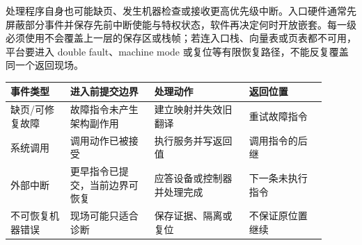 
处理程序自身也可能缺页、发生机器检查或接收更高优先级中断。入口硬件通常先屏蔽部分事件并保存先前中断使能与特权状态，软件再决定何时开放嵌套。每一级必须使用不会覆盖上一层的保存区或栈帧；若连入口栈、向量表或页表都不可用，平台要进入 double fault、machine mode 或复位等有限恢复路径，不能反复覆盖同一个返回现场。

\begin{longtable}{L{0.17\linewidth}L{0.24\linewidth}L{0.27\linewidth}L{0.22\linewidth}}
\toprule
事件类型 & 进入前提交边界 & 处理动作 & 返回位置 \\
\midrule
缺页/可修复故障 & 故障指令未产生架构副作用 & 建立映射并失效旧翻译 & 重试故障指令 \\\tablerowrule
系统调用 & 调用动作已被接受 & 执行服务并写返回值 & 调用指令的后继 \\\tablerowrule
外部中断 & 更早指令已提交，当前边界可恢复 & 应答设备或控制器并处理完成 & 下一条未执行指令 \\\tablerowrule
不可恢复机器错误 & 现场可能只适合诊断 & 保存证据、隔离或复位 & 不保证原位置继续 \\
\bottomrule
\end{longtable}
